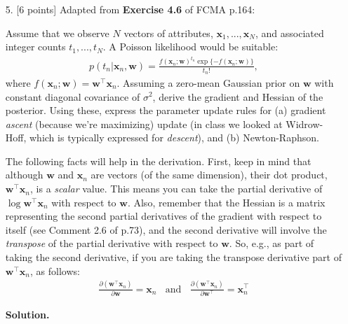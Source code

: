 \documentclass[10pt]{article}
\begin{document}
\begin{itemize}
\item[5.]  [6 points]
Adapted from {\bf Exercise 4.6} of FCMA p.164:

Assume that we observe $N$ vectors of attributes, $\mathbf{x}_1, ..., \mathbf{x}_N$, and associated integer counts $t_1, ..., t_N$.  A Poisson likelihood would be suitable:
\begin{eqnarray*}
p(t_n | \mathbf{x}_n, \mathbf{w}) = \frac{f(\mathbf{x}_n; \mathbf{w})^{t_n} \exp \{ -f(\mathbf{x}_n; \mathbf{w}) \}}{t_n!},
\end{eqnarray*}
where $f(\mathbf{x}_n;\mathbf{w}) = \mathbf{w}^\top\mathbf{x}_n$.
Assuming a zero-mean Gaussian prior on $\mathbf{w}$ with constant diagonal covariance of $\sigma^2$, derive the gradient and Hessian of the posterior.  Using these, express the parameter update rules for (a) gradient {\em ascent} (because we're maximizing) update (in class we looked at Widrow-Hoff, which is typically expressed for {\em descent}), and (b) Newton-Raphson.

The following facts will help in the derivation.  First, keep in mind that although $\mathbf{w}$ and $\mathbf{x}_n$ are vectors (of the same dimension), their dot product, $\mathbf{w}^\top\mathbf{x}_n$, is a {\em scalar} value.  This means you can take the partial derivative of $\log \mathbf{w}^\top\mathbf{x}_n$ with respect to $\mathbf{w}$.  Also, remember that the Hessian is a matrix representing the second partial derivatives of the gradient with respect to itself (see Comment 2.6 of p.73), and the second derivative will involve the {\em transpose} of the partial derivative with respect to $\mathbf{w}$.  So, e.g., as part of taking the second derivative, if you are taking the transpose derivative part of $\mathbf{w}^\top\mathbf{x}_n$, as follows:
\begin{eqnarray*}
\frac{\partial (\mathbf{w}^\top \mathbf{x}_n)}{\partial \mathbf{w}} = \mathbf{x}_n
~~~~\mathrm{and}~~~~
\frac{\partial (\mathbf{w}^\top \mathbf{x}_n)}{\partial \mathbf{w}^\top} = \mathbf{x}_n^\top
\end{eqnarray*}

{\bf Solution.} %


\end{itemize}
\end{document}
